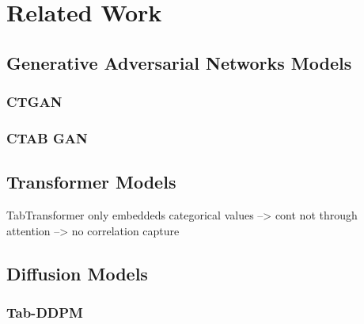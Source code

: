 \chapter{Related Work}
\label{ch:relatedWork}


\section{Generative Adversarial Networks Models}
\label{ch:relatedWork-generativeAdversarialNetworksModels}

\subsection{CTGAN}
\label{ch:relatedWork-generativeAdversarialNetworksModels-ctgan}

\subsection{CTAB GAN}
\label{ch:relatedWork-generativeAdversarialNetworksModels-ctabGAN}
\section{Transformer Models}
\label{ch:relatedWork-transformers}

TabTransformer only embeddeds categorical values --> cont not through attention --> no correlation capture \cite{somepalli2021SAINTImprovedNeural}

\section{Diffusion Models}
\label{ch:relatedWork-diffusionModels}

\subsection{Tab-DDPM}
\label{ch:relatedWork-diffusionModels-tabDDPM}



